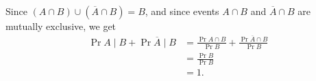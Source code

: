Since $(A\cap B)\cup(\overline{A}\cap B)=B$, and since events $A\cap B$ and $\overline{A}\cap B$ are mutually exclusive, we get
\begin{align*}
    \Pr{A\mid B}+\Pr{\overline{A}\mid B} &= \frac{\Pr{A\cap B}}{\Pr{B}}+\frac{\Pr{\overline{A}\cap B}}{\Pr{B}} \\[1mm]
    &= \frac{\Pr{B}}{\Pr{B}} \\
    &= 1.
\end{align*}
